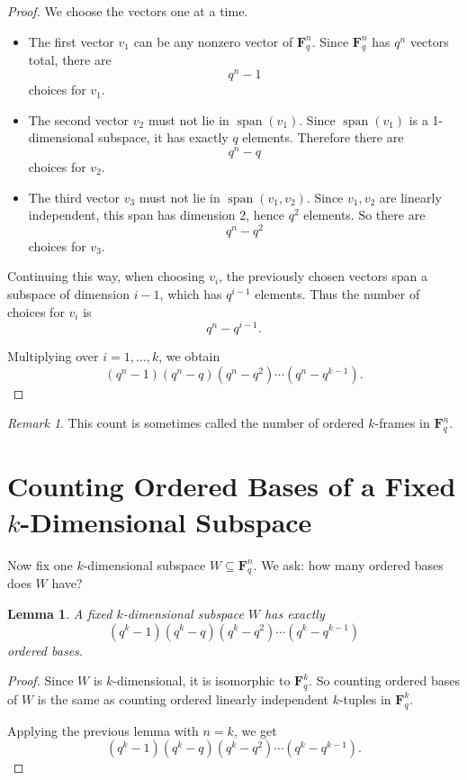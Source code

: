 \documentclass[11pt]{article}
\newtheorem{lemma}[theorem]{Lemma}
\theoremstyle{definition}
\theoremstyle{remark}
\newtheorem{remark}[theorem]{Remark}
\newcommand{\F}{\mathbf{F}}
\newcommand{\Span}{\operatorname{span}}
\begin{document}
	\begin{proof}
		We choose the vectors one at a time.
		
		\begin{itemize}
			\item The first vector \(v_1\) can be any nonzero vector of \(\F_q^n\). Since \(\F_q^n\) has \(q^n\) vectors total, there are
			\[
			q^n-1
			\]
			choices for \(v_1\).
			
			\item The second vector \(v_2\) must not lie in \(\Span(v_1)\). Since \(\Span(v_1)\) is a 1-dimensional subspace, it has exactly \(q\) elements. Therefore there are
			\[
			q^n-q
			\]
			choices for \(v_2\).
			
			\item The third vector \(v_3\) must not lie in \(\Span(v_1,v_2)\). Since \(v_1,v_2\) are linearly independent, this span has dimension \(2\), hence \(q^2\) elements. So there are
			\[
			q^n-q^2
			\]
			choices for \(v_3\).
		\end{itemize}
		
		Continuing this way, when choosing \(v_i\), the previously chosen vectors span a subspace of dimension \(i-1\), which has \(q^{i-1}\) elements. Thus the number of choices for \(v_i\) is
		\[
		q^n-q^{i-1}.
		\]
		
		Multiplying over \(i=1,\dots,k\), we obtain
		\[
		(q^n-1)(q^n-q)(q^n-q^2)\cdots(q^n-q^{k-1}).
		\]
	\end{proof}
	
	\begin{remark}
		This count is sometimes called the number of ordered \(k\)-frames in \(\F_q^n\).
	\end{remark}
	
	\section{Counting Ordered Bases of a Fixed \(k\)-Dimensional Subspace}
	
	Now fix one \(k\)-dimensional subspace \(W\subseteq \F_q^n\). We ask: how many ordered bases does \(W\) have?
	
	\begin{lemma}
		A fixed \(k\)-dimensional subspace \(W\) has exactly
		\[
		(q^k-1)(q^k-q)(q^k-q^2)\cdots(q^k-q^{k-1})
		\]
		ordered bases.
	\end{lemma}
	
	\begin{proof}
		Since \(W\) is \(k\)-dimensional, it is isomorphic to \(\F_q^k\). So counting ordered bases of \(W\) is the same as counting ordered linearly independent \(k\)-tuples in \(\F_q^k\).
		
		Applying the previous lemma with \(n=k\), we get
		\[
		(q^k-1)(q^k-q)(q^k-q^2)\cdots(q^k-q^{k-1}).
		\]
	\end{proof}
	
\end{document}
